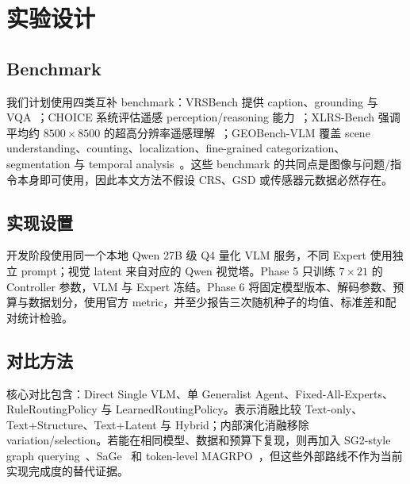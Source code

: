 \documentclass[10pt,a4paper,twocolumn]{ctexart}
\begin{document}
\section{实验设计}
\subsection{Benchmark}
我们计划使用四类互补 benchmark：VRSBench 提供 caption、grounding 与 VQA~\cite{vrsbench}；CHOICE 系统评估遥感 perception/reasoning 能力~\cite{choice}；XLRS-Bench 强调平均约 $8500\times8500$ 的超高分辨率遥感理解~\cite{xlrs}；GEOBench-VLM 覆盖 scene understanding、counting、localization、fine-grained categorization、segmentation 与 temporal analysis~\cite{geobench}。这些 benchmark 的共同点是图像与问题/指令本身即可使用，因此本文方法不假设 CRS、GSD 或传感器元数据必然存在。

\subsection{实现设置}
开发阶段使用同一个本地 Qwen 27B 级 Q4 量化 VLM 服务，不同 Expert 使用独立 prompt；视觉 latent 来自对应的 Qwen 视觉塔。Phase 5 只训练 $7\times21$ 的 Controller 参数，VLM 与 Expert 冻结。Phase 6 将固定模型版本、解码参数、预算与数据划分，使用官方 metric，并至少报告三次随机种子的均值、标准差和配对统计检验。

\subsection{对比方法}
核心对比包含：Direct Single VLM、单 Generalist Agent、Fixed-All-Experts、RuleRoutingPolicy 与 LearnedRoutingPolicy。表示消融比较 Text-only、Text+Structure、Text+Latent 与 Hybrid；内部演化消融移除 variation/selection。若能在相同模型、数据和预算下复现，则再加入 SG2-style graph querying~\cite{sg2}、SaGe~\cite{sage} 和 token-level MAGRPO~\cite{magrpo}，但这些外部路线不作为当前实现完成度的替代证据。
\end{document}
